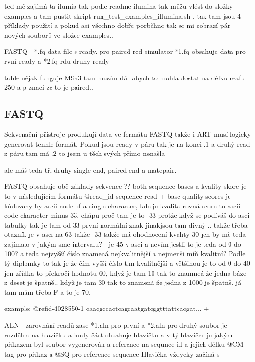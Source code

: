 \documentclass[czech,DP]{thesiskiv}
\begin{document}
teď mě zajímá ta ilumia tak podle readme ilumina tak můžu vlést do složky examples a tam pustit skript run\_test\_examples\_illumina.sh , tak tam jsou 4 příklady použití 
a pokud asi všechno dobře porběhne tak se mi zobrazí pár nových souborů ve složce examples.. 

FASTQ - *.fq data file s ready. pro paired-red simulator
*1.fq obsahuje data pro rvní ready a *2.fq rdu druhy ready

tohle nějak funguje
MSv3 tam musím dát abych to mohla dostat na délku reafu 250 a p znaci ze to je paired.. 


\subsection{FASTQ}
Sekvenační přístroje produkují data ve formátu FASTQ takže i ART musí logicky generovat tenhle formát.
Pokud jsou ready v páru tak je na konci .1
a druhý read z páru tam má .2 to jsem u těch svých přímo nenašla 

ale máš teda tři druhy single end, paired-end a matepair. 

FASTQ obsahuje obě základy sekvence ?? both sequence bases a kvality skore je to v následujícím formátu
@read\_id
sequence read
+
base quality scores je kódovany by ascii code of a single character, kde je kvalita rovná score to ascii code character minus 33. chápu proč tam je to -33 protže když se podíváš do asci tabulky tak je tam od 33 první normální znak jinakjsou tam divný .. 
takže třeba otazník je v asci na 63 takže -33 takže má ohodnocení kvality 30
jen by mě teda zajímalo v jakým sme intervalu? - je 45 v asci a nevím jestli to je teda od 0 do 100?  a teda nejvyšší číslo znamená nejkvalitnější a nejmenši míň kvalitní? Podle tý diplomky to tak je že čím vyšší číslo tím kvalitnější a většinou je to od 0 do 40 jen zřídka to překročí hodnotu 60, když je tam 10 tak to znamneá že jedna báze z deset je špatně.. když je tam 30 tak to znamená že jedna z 1000 je špatně.
já tam mám třeba F a to je 70.

example:
		@refid-4028550-1 
		caacgccactcagcaatgatcggtttattcacgat...
		+ 

ALN - zarovnání readů
zase *1.aln pro první a *2.aln pro druhý
soubor je rozdělen na hlavičku a body část
obsahuje hlavičku a v tý hlavičce je jakým příkazem byl soubor vygenerován a reference na sequnce id a jejich délku
@CM tag pro příkaz a
@SQ pro reference sequence
Hlavička vždycky začíná s 
\end{document}
